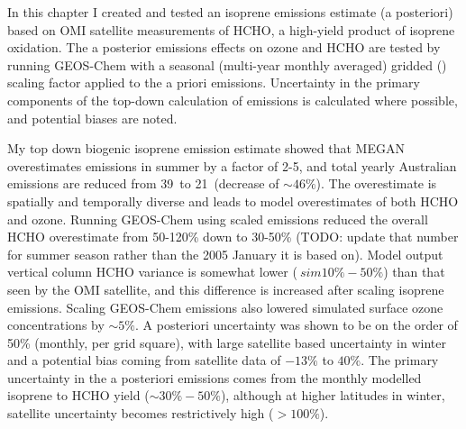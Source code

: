   In this chapter I created and tested an isoprene emissions estimate (a posteriori) based on OMI satellite measurements of HCHO, a high-yield product of isoprene oxidation.
  The a posterior emissions effects on ozone and HCHO are tested by running GEOS-Chem with a seasonal (multi-year monthly averaged) gridded (\lowhr) scaling factor applied to the a priori emissions.
  Uncertainty in the primary components of the top-down calculation of emissions is calculated where possible, and potential biases are noted.
  
  My top down biogenic isoprene emission estimate showed that MEGAN overestimates emissions in summer by a factor of 2-5, and total yearly Australian emissions are reduced from 39\tgpyr ~to 21\tgpyr ~(decrease of $\sim 46\%$).
  The overestimate is spatially and temporally diverse and leads to model overestimates of both HCHO and ozone.
  Running GEOS-Chem using scaled emissions reduced the overall HCHO overestimate from 50-120\% down to 30-50\% (TODO: update that number for summer season rather than the 2005 January it is based on).
  Model output vertical column HCHO variance is somewhat lower ($~sim{10\%-50\%}$) than that seen by the OMI satellite, and this difference is increased after scaling isoprene emissions.
  Scaling GEOS-Chem emissions also lowered simulated surface ozone concentrations by $\sim 5\%$.
  A posteriori uncertainty was shown to be on the order of 50\%  (monthly, per grid square), with large satellite based uncertainty in winter and a potential bias coming from satellite data of $-13\%$ to $40\%$.
  The primary uncertainty in the a posteriori emissions comes from the monthly modelled isoprene to HCHO yield ($\sim 30\%-50\%$), although at higher latitudes in winter, satellite uncertainty becomes restrictively high ($>100\%$).
  
  
  
